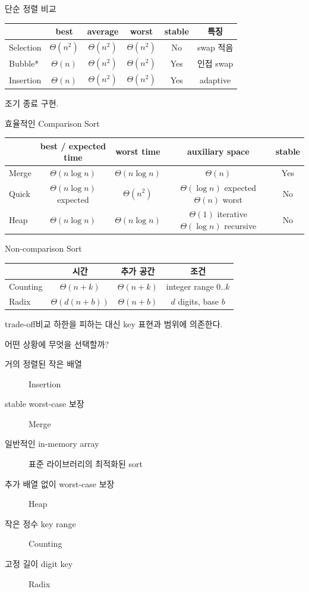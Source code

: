 \begin{frame}{단순 정렬 비교}
\centering\small\begin{tabular}{lccccc}\toprule&best&average&worst&stable&특징\\\midrule Selection&$\Theta(n^2)$&$\Theta(n^2)$&$\Theta(n^2)$&No&swap 적음\\Bubble*&$\Theta(n)$&$\Theta(n^2)$&$\Theta(n^2)$&Yes&인접 swap\\Insertion&$\Theta(n)$&$\Theta(n^2)$&$\Theta(n^2)$&Yes&adaptive\\\bottomrule\end{tabular}
\vspace{3mm}\small *조기 종료 구현.
\end{frame}
\begin{frame}{효율적인 Comparison Sort}
\centering\small\begin{tabular}{lcccc}\toprule&\shortstack{best / expected\\time}&worst time&auxiliary space&stable\\\midrule Merge&$\Theta(n\log n)$&$\Theta(n\log n)$&$\Theta(n)$&Yes\\Quick&$\Theta(n\log n)$ expected&$\Theta(n^2)$&\shortstack{$\Theta(\log n)$ expected\\$\Theta(n)$ worst}&No\\Heap&$\Theta(n\log n)$&$\Theta(n\log n)$&\shortstack{$\Theta(1)$ iterative\\$\Theta(\log n)$ recursive}&No\\\bottomrule\end{tabular}\par
\vspace{3mm}{\small 배열 구현 기준. Heap space는 MAX-HEAPIFY 구현 방식에 따라 달라진다.\par}
\end{frame}
\begin{frame}{Non-comparison Sort}
\centering\begin{tabular}{lccc}\toprule&시간&추가 공간&조건\\\midrule Counting&$\Theta(n+k)$&$\Theta(n+k)$&integer range $0..k$\\Radix&$\Theta(d(n+b))$&$\Theta(n+b)$&$d$ digits, base $b$\\\bottomrule\end{tabular}
\begin{alertblock}{trade-off}비교 하한을 피하는 대신 key 표현과 범위에 의존한다.\end{alertblock}
\end{frame}
\begin{frame}{어떤 상황에 무엇을 선택할까?}
\begin{description}\item[거의 정렬된 작은 배열] Insertion\item[stable worst-case 보장] Merge\item[일반적인 in-memory array] 표준 라이브러리의 최적화된 sort\item[추가 배열 없이 worst-case 보장] Heap\item[작은 정수 key range] Counting\item[고정 길이 digit key] Radix\end{description}
\end{frame}
